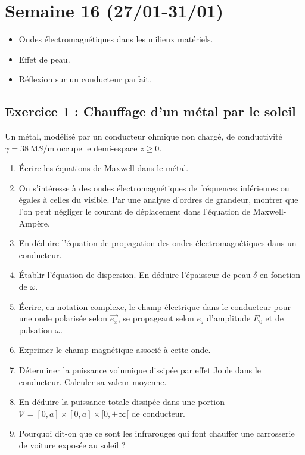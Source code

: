 \section{Semaine 16 (27/01-31/01) }

\begin{itemize}
	\item Ondes électromagnétiques dans les milieux matériels.
	\item Effet de peau.
	\item Réflexion sur un conducteur parfait.
\end{itemize}

\subsection{Exercice 1 : Chauffage d'un métal par le soleil}

Un métal, modélisé par un conducteur ohmique non chargé, de conductivité $\gamma = \SI{38}{\mega S\per\meter}$ occupe le demi-espace $z \geq 0$. 

\begin{enumerate}
	\item Écrire les équations de Maxwell dans le métal.
	\item On s'intéresse à des ondes électromagnétiques de fréquences inférieures ou égales à celles du visible. Par une analyse d'ordres de grandeur, montrer que l'on peut négliger le courant de déplacement dans l'équation de Maxwell-Ampère.
	\item En déduire l'équation de propagation des ondes électromagnétiques dans un conducteur.
	\item Établir l'équation de dispersion. En déduire l'épaisseur de peau $\delta$ en fonction de $\omega$.
	\item Écrire, en notation complexe, le champ électrique dans le conducteur pour une onde polarisée selon $\vec{e_x}$, se propageant selon $e_z$ d'amplitude $E_0$ et de pulsation $\omega$.
	\item Exprimer le champ magnétique associé à cette onde.
	\item Déterminer la puissance volumique dissipée par effet Joule dans le conducteur. Calculer sa valeur moyenne. 
	\item En déduire la puissance totale dissipée dans une portion $\mathcal{V} = [0, a]\times[0, a]\times[0, +\infty[$ de conducteur. 
	\item Pourquoi dit-on que ce sont les infrarouges qui font chauffer une carrosserie de voiture exposée au soleil ?
\end{enumerate}

